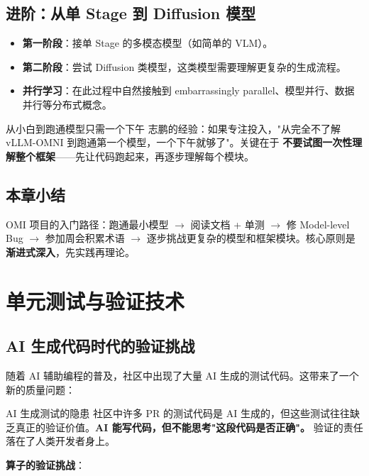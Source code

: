 \documentclass[a4paper]{article}
\begin{document}
\subsection{进阶：从单 Stage 到 Diffusion 模型}

\begin{itemize}
\item \textbf{第一阶段}：接单 Stage 的多模态模型（如简单的 VLM）。
\item \textbf{第二阶段}：尝试 Diffusion 类模型，这类模型需要理解更复杂的生成流程。
\item \textbf{并行学习}：在此过程中自然接触到 embarrassingly parallel、模型并行、数据并行等分布式概念。
\end{itemize}

\begin{knowledgebox}{从小白到跑通模型只需一个下午}
志鹏的经验：如果专注投入，"从完全不了解 vLLM-OMNI 到跑通第一个模型，一个下午就够了"。关键在于 \textbf{不要试图一次性理解整个框架}——先让代码跑起来，再逐步理解每个模块。
\end{knowledgebox}

\subsection{本章小结}

OMI 项目的入门路径：跑通最小模型 $\rightarrow$ 阅读文档 + 单测 $\rightarrow$ 修 Model-level Bug $\rightarrow$ 参加周会积累术语 $\rightarrow$ 逐步挑战更复杂的模型和框架模块。核心原则是\textbf{渐进式深入}，先实践再理论。

\newpage
\section{单元测试与验证技术}

\subsection{AI 生成代码时代的验证挑战}

随着 AI 辅助编程的普及，社区中出现了大量 AI 生成的测试代码。这带来了一个新的质量问题：

\begin{warningbox}{AI 生成测试的隐患}
社区中许多 PR 的测试代码是 AI 生成的，但这些测试往往缺乏真正的验证价值。\textbf{AI 能写代码，但不能思考"这段代码是否正确"。} 验证的责任落在了人类开发者身上。
\end{warningbox}

\textbf{算子的验证挑战}：
\end{document}
